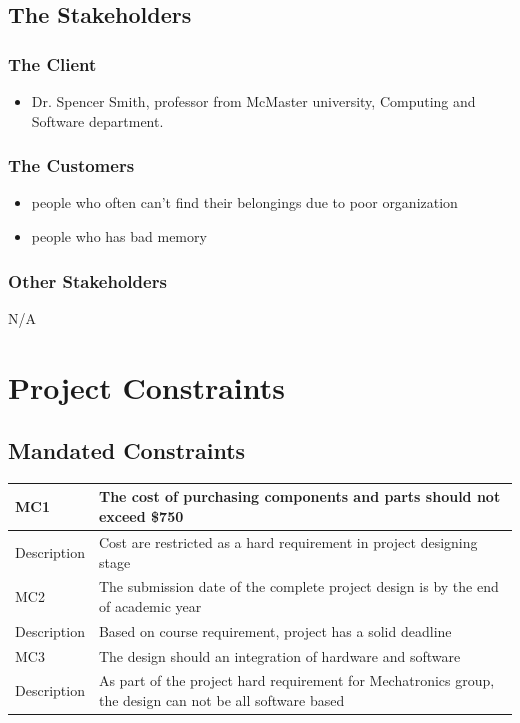 \documentclass[12pt]{article}
\begin{document}
\subsection{The Stakeholders}

\subsubsection{The Client}
\begin{itemize}
    \item Dr. Spencer Smith, professor from McMaster university, Computing and Software department. 
\end{itemize}

\subsubsection{The Customers}
\begin{itemize}
    \item people who often can't find their belongings due to poor organization
   	\item people who has bad memory  
\end{itemize}
\subsubsection{Other Stakeholders}
N/A
\section{Project Constraints}
\subsection{Mandated Constraints}
\begin{center}
    \begin{tabular}{|| p{3cm} || p{8cm} ||}
    \hline
    MC1 & The cost of purchasing components and parts should not exceed \$750  \\
    \hline
    Description & Cost are restricted as a hard requirement in project designing stage \\
    \hline\hline
    MC2  & The submission date of the complete project design is by the end of academic year\\
    \hline
    Description & Based on course requirement, project has a solid deadline\\
    \hline\hline
    MC3 & The design should an integration of hardware and software\\
    \hline
    Description & As part of the project hard requirement for Mechatronics group, the design can not be all software based \\
    \hline\hline
    \end{tabular}
\end{center}
\end{document}
